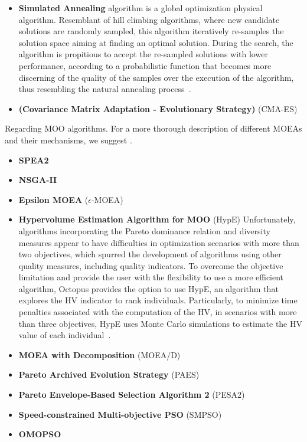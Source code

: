 \begin{itemize}
	\item \textbf{Simulated Annealing} algorithm is a global optimization physical algorithm. Resemblant of hill climbing algorithms, where new candidate solutions are randomly sampled, this algorithm iteratively re-samples the solution space aiming at finding an optimal solution. During the search, the algorithm is propitious to accept the re-sampled solutions with lower performance, according to a probabilistic function that becomes more discerning of the quality of the samples over the execution of the algorithm, thus resembling the natural annealing process~\cite{Brownlee2011}. 
	
	\item \textbf{(Covariance Matrix Adaptation - Evolutionary Strategy)} (CMA-ES) 
\end{itemize}

Regarding \ac{MOO} algorithms. 
For a more thorough description of different \acp{MOEA} and their mechanisms, we suggest \cite{Zhou2011}. 

\begin{itemize}
	\item \textbf{SPEA2}
	
	\item \textbf{NSGA-II}
	
	\item \textbf{Epsilon \ac{MOEA}} ($\epsilon$-MOEA) 
	
	\item \textbf{Hypervolume Estimation Algorithm for \ac{MOO}} (HypE) 
	Unfortunately, algorithms incorporating the Pareto dominance relation and diversity measures appear to have difficulties in optimization scenarios with more than two objectives, which spurred the development of algorithms using other quality measures, including quality indicators. To overcome the objective limitation and provide the user with the flexibility to use a more efficient algorithm, Octopus provides the option to use HypE, an algorithm that explores the \ac{HV} indicator to rank individuals. Particularly, to minimize time penalties associated with the computation of the \ac{HV}, in scenarios with more than three objectives, HypE uses Monte Carlo simulations to estimate the \ac{HV} value of each individual~\cite{Zitzler2011HypE}. 
	
	\item \textbf{\ac{MOEA} with Decomposition} (MOEA/D)
	
	\item \textbf{Pareto Archived Evolution Strategy} (PAES)
	
	\item \textbf{Pareto Envelope-Based Selection Algorithm 2} (PESA2)
	
	\item \textbf{Speed-constrained Multi-objective \ac{PSO}} (SMPSO)
	
	\item \textbf{OMOPSO}
	
\end{itemize}


